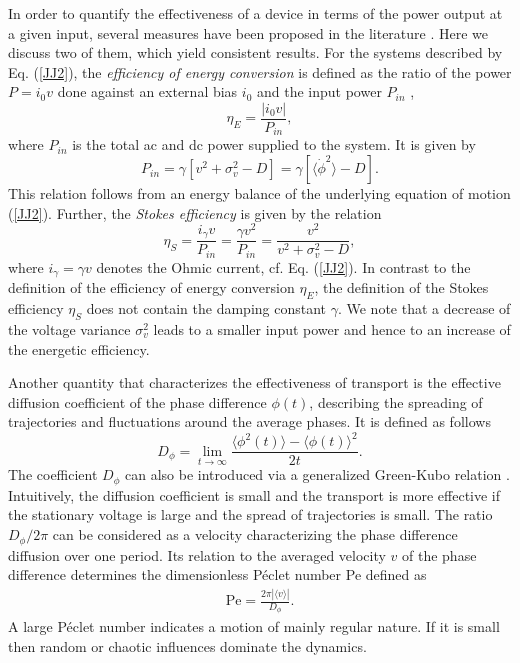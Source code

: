 \documentclass{physeauth}
\def\be{\begin{equation}}
\def\ba{\begin{eqnarray}}
\def\ee#1{\label{#1}\end{equation}}
\def\ea#1{\label{#1}\end{eqnarray}}
\def\la{\langle}
\def\ra{\rangle}
\begin{document}
In order to quantify the effectiveness of a device in terms of the
power output at a given input, several measures have been proposed in
the literature \cite{bier,Sekimoto2000,Suzuki2003,wang,machuraPRE,rozen}.
Here we discuss %
two of them, which yield consistent results. 
 For the systems described by Eq. (\ref{JJ2}), the  {\it efficiency of
 energy conversion} is defined as the  ratio of the power $P=i_0 v$
 done against an external  bias $i_0$ and 
the input power $P_{in}$  \cite{sintes,physA},
%
\be \eta_{E} = \frac{|i_0 v|}{P_{in}},   \ee{EtaEnergy}
%
%
where $P_{in}$ is the total ac and dc power supplied to the system.
It is given by \cite{machuraPRE}
%
\be
 P_{in}   = \gamma [v^2  + \sigma_v^2 - D]  = \gamma [\la \dot\phi^2 \ra - D]. 
\ee{eta}
%
This relation follows from an energy balance of the underlying
 equation of motion  (\ref{JJ2}). 
Further, the  {\it Stokes efficiency}  is given by the relation \cite{wang} 
%
\be 
\eta_{S} =  \frac{i_{\gamma} v}{P_{in}}=\frac{\gamma v^2}{P_{in}} 
= \frac{ v^2}{v^2  + \sigma_v^2 - D},   
\ee{EtaStokes}
%
where  $i_{\gamma} = \gamma v$ denotes the Ohmic current, cf. Eq. (\ref{JJ2}). 
In contrast to the definition of the efficiency of energy conversion $\eta_E$, the definition 
of the Stokes efficiency $\eta_S$  does not  contain  the damping  constant $\gamma$. 
We note that a decrease of the voltage variance $\sigma_v^{2}$ leads
to a smaller input power and hence to an increase of the energetic
efficiency. 

Another quantity that characterizes the effectiveness of transport is
the effective diffusion coefficient of the phase difference $\phi(t)$,
describing the spreading of 
trajectories and fluctuations around the average phases. 
It is defined as follows
%
\be D_{\phi} = \lim_{t \rightarrow \infty} \frac{\la \phi^2(t) \ra - \la
\phi(t) \ra^2}{2t}.  \ee{Deff}
The coefficient $D_{\phi}$ can also be introduced via a generalized
Green-Kubo relation \cite{machuraJPC}.  Intuitively, the
diffusion coefficient is small and the transport is more effective if
the stationary 
voltage is large and the spread of trajectories is small.
The ratio $D_{\phi}/2\pi$ can be considered as a velocity characterizing the
phase difference diffusion over one period. Its relation to the
averaged velocity $v$ of the phase difference  determines the
dimensionless P\'eclet number Pe defined as
%
\ba \mbox{Pe} = \frac{ 2\pi|\la v \ra| }{D_{\phi}}. 
 \ea{factors}
%
A large P\'eclet number indicates a motion of mainly regular
nature.  If it is small then random or chaotic influences dominate the dynamics.      
\end{document}
